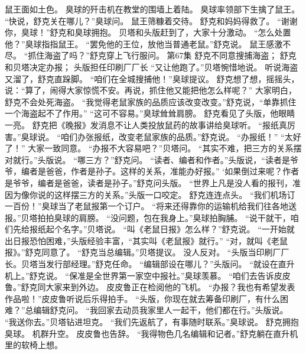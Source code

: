 \documentclass[a4paper,12pt,UTF8,twoside]{ctexbook}
\begin{document}
        鼠王面如土色。 
        臭球的歼击机在教堂的围墙上着陆。 
        臭球率领部下生擒了鼠王。 
        “快说，舒克关在哪儿？”臭球问。 
        鼠王筛糠着交待。 
        舒克和妈妈得救了。 
        “谢谢你，臭球！”舒克和臭球拥抱。 
        贝塔和头版赶到了，大家十分激动。 
        “怎么处置他？”臭球指指鼠王。 
        “罢免他的王位，放他当普通老鼠。”舒克说。 
        鼠王感激不尽。 
        “抓住海盗了吗？”舒克穿上飞行服问。   第67集 
        舒克不同意搜捕海盗； 
        舒克和贝塔决定办报； 
        头版担任印刷厂厂长   
        “又让他跑了。”贝塔惋惜地说。 
        听说海盗又溜了，舒克直跺脚。 
        “咱们在全城搜捕他！”臭球提议。 
        舒克想了想，摇摇头，说：“算了，闹得大家惊慌不安。再说，抓住他又能把他怎么样呢？” 
        大家明白，舒克不会处死海盗。 
        “我觉得老鼠家族的品质应该改变改变。”舒克说，“单靠抓住一个海盗起不了作用。” 
        “这可不容易。”臭球耸耸肩膀。 
        舒克看见了头版，他眼睛一亮。 
        舒克把《晚报》发消息不让人类投放鼠药的故事讲给臭球听。 
        “报纸真厉害。”臭球说。 
        “咱们办张报纸，改变老鼠家族的品质。”舒克说。 
        “办报纸！” 
        “太好了！” 
        大家一致同意。 
        “办报不大容易吧？”贝塔问。 
        “其实不难，把三方的关系摆对就行。”头版说。 
        “哪三方？”舒克问。 
        “读者、编者和作者。”头版说，“读者是爷爷，编者是爸爸，作者是孙子。这样的关系，准能办好报。” 
        ‘如果倒过来呢？作者是爷爷，编者是爸爸，读者是孙子。”舒克问头版。 
        “世界上凡是没人看的报刊，准因为像你说的这样摆三方的关系。”头版一口咬定。 
        舒克连连点头。 
        “我们机场订一百份！”臭球当了老鼠报第一个订户。 
        “将来还得靠你的运输机给我们往各地送报。”贝塔拍拍臭球的肩膀。 
        “没问题，包在我身上。”臭球拍胸脯。 
        “说干就干，咱们先给报纸起个名字。”贝塔说。 
        “叫《老鼠日报》怎么样？”舒克说。 
        “一开始就出日报恐怕困难，”头版经验丰富，“其实叫《老鼠报》就行。” 
        “对，就叫《老鼠报》。”舒克同意了。 
        “舒克当总编辑。”贝塔提议。 
        没人反对。 
        “头版当印刷厂厂长。贝塔当发行部经理。”舒克任命。 
        “编辑部设在哪儿？”头版问。 
        “就设在直升机上。”舒克说。 
        “保准是全世界第一家空中报社。”臭球羡慕。 
        “咱们去告诉皮皮鲁。”舒克同大家来到外边。 
        皮皮鲁正在检阅他的飞机。 
        “办报？我也有希望发表作品啦！”皮皮鲁听说后乐得拍手。 
        “头版，你现在就去筹备印刷厂，有什么困难？”总编辑舒克问。 
        “我回家去动员我家里人一起干，他们都在行。”头版说。 
        “我送你去。”贝塔钻进坦克。 
        “我们先返航了，有事随时联系。”臭球说。 
        舒克拥抱臭球。 
        机群升空。 
        皮皮鲁也告辞。 
        “我得物色几名编辑和记者。”舒克躺在直升机里的软椅上想。 
\end{document}
